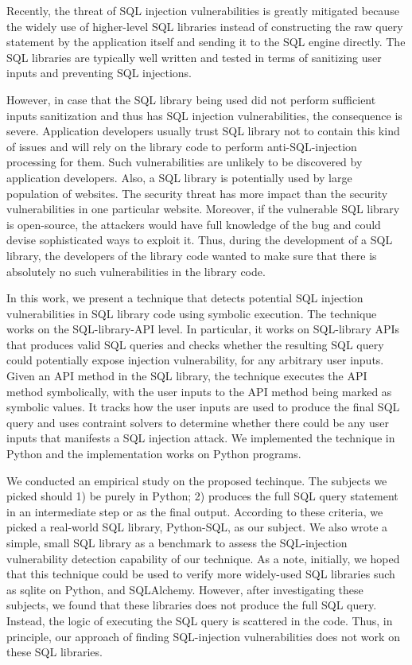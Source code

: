 \documentclass[conference]{IEEEtran}
\begin{document}
Recently, the threat of SQL injection vulnerabilities is greatly mitigated because the widely use of higher-level SQL libraries instead of constructing the raw query statement by the application itself and sending it to the SQL engine directly. The SQL libraries are typically well written and tested in terms of sanitizing user inputs and preventing SQL injections. 

However, in case that the SQL library being used did not perform sufficient inputs sanitization and thus has SQL injection vulnerabilities, the consequence is severe. Application developers usually trust SQL library not to contain this kind of issues and will rely on the library code to perform anti-SQL-injection processing for them. Such vulnerabilities are unlikely to be discovered by application developers. Also, a SQL library is potentially used by large population of websites. The security threat has more impact than the security vulnerabilities in one particular website. Moreover, if the vulnerable SQL library is open-source, the attackers would have full knowledge of the bug and could devise sophisticated ways to exploit it. Thus, during the development of a SQL library, the developers of the library code wanted to make sure that there is absolutely no such vulnerabilities in the library code.

In this work, we present a technique that detects potential SQL injection vulnerabilities in SQL library code using symbolic execution. The technique works on the SQL-library-API level. In particular, it works on SQL-library APIs that produces valid SQL queries and checks whether the resulting SQL query could potentially expose injection vulnerability, for any arbitrary user inputs. Given an API method in the SQL library, the technique executes the API method symbolically, with the user inputs to the API method being marked as symbolic values. It tracks how the user inputs are used to produce the final SQL query and uses contraint solvers to determine whether there could be any user inputs that manifests a SQL injection attack. We implemented the technique in Python and the implementation works on Python programs.

We conducted an empirical study on the proposed techinque. The subjects we picked should 1) be purely in Python; 2) produces the full SQL query statement in an intermediate step or as the final output. According to these criteria, we picked a real-world SQL library, Python-SQL, as our subject. We also wrote a simple, small SQL library as a benchmark to assess the SQL-injection vulnerability detection capability of our technique.
As a note, initially, we hoped that this technique could be used to verify more widely-used SQL libraries such as sqlite on Python, and SQLAlchemy. However, after investigating these subjects, we found that these libraries does not produce the full SQL query. Instead, the logic of executing the SQL query is scattered in the code. Thus, in principle, our approach of finding SQL-injection vulnerabilities does not work on these SQL libraries.
\end{document}
